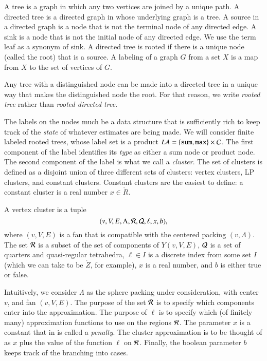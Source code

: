 
\begin{definition}
A tree is a graph in which any two vertices are joined by a unique path.
A directed tree is a directed graph in whose underlying graph is a tree.
A source in a directed graph is a node that is not the terminal node
of any directed edge.  A sink is a node that is not the initial node
of any directed edge.  We use the term leaf as a synonym of sink.
A directed tree is rooted if there is a unique node (called
the root) that is a source.
A labeling of a graph $G$ from a set $X$ is a map from $X$ to the set
of vertices of $G$.
\end{definition}

Any tree with a distinguished node can be made into a directed
tree in a unique way that makes the distinguished node the root. 
For that reason, we write {\it rooted tree} rather than
{\it rooted directed tree}.

The labels on the nodes much be a data structure that is sufficiently
rich to keep track of the {\it state} of whatever estimates are
being made.
We will consider finite labeled rooted trees, whose label set
is a product $LA=\{{\tt sum, max}\} \times {\cal C}$.   The first
component of the label identifies its {\it type} as either a sum
node or product node. 
The second component of the label is what we call a {\it cluster}.
The set of clusters is defined as a disjoint union of three different sets
of clusters:  vertex clusters, LP clusters, and constant clusters.
Constant clusters are the easiest to define: a constant cluster
is a real number $x\in\ring{R}$.  

\begin{definition}
A vertex
cluster is a tuple
    $$
    (v,V,E,\Lambda,{\cal R},{\cal Q},\ell,x,b),
    $$
where $(v,V,E)$ is a fan that is compatible with
the centered packing $(v,\Lambda)$.  
The set ${\cal R}$ is a subset of the set of components of $Y(v,V,E)$,
${\cal Q}$ is a set of quarters and quasi-regular tetrahedra,
$\ell\in I$ is a discrete index from some set $I$ (which we can
take to be $\ring{Z}$, for example), 
$x$ is a real number, and
$b$ is either true or false.
\end{definition}

Intuitively, we consider $\Lambda$ as the sphere packing under
consideration, with center $v$, and fan $(v,V,E)$.
The purpose of the set ${\cal R}$ is to specify which components
enter into the approximation.  The purpose of $\ell$ is to specify
which (of finitely many) approximation functions to use on the
regions ${\cal R}$.  The parameter $x$ is a constant that in \cite{DCG}
is called a {\it penalty}.  The cluster approximation is to be
thought of as $x$ plus the value of the function $\ell$ on ${\cal R}$.
Finally, the boolean parameter $b$ keeps track of the branching into
cases.

